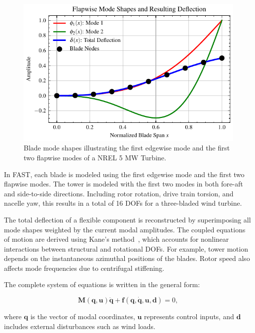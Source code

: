 \begin{figure}[ht]
    \centering
    \includegraphics[width=\textwidth]{Figures/blade_modes.pdf}
    \caption{Blade mode shapes illustrating the first edgewise mode and the first two flapwise modes of a NREL 5 MW Turbine.}
    \label{fig:blade_mode_shapes}
\end{figure}

In FAST, each blade is modeled using the first edgewise mode and the first two flapwise modes. The tower is modeled with the first two modes in both fore-aft and side-to-side directions. Including rotor rotation, drive train torsion, and nacelle yaw, this results in a total of 16 DOFs for a three-bladed wind turbine.

The total deflection of a flexible component is reconstructed by superimposing all mode shapes weighted by the current modal amplitudes. The coupled equations of motion are derived using Kane’s method~\cite{kane1985}, which accounts for nonlinear interactions between structural and rotational DOFs. For example, tower motion depends on the instantaneous azimuthal positions of the blades. Rotor speed also affects mode frequencies due to centrifugal stiffening.

The complete system of equations is written in the general form:

\begin{equation}
    \mathbf{M}(\mathbf{q}, \mathbf{u}) \ddot{\mathbf{q}} + \mathbf{f}(\mathbf{q}, \dot{\mathbf{q}}, \mathbf{u}, \mathbf{d}) = 0, \label{eq:general_eom}
\end{equation}

where $\mathbf{q}$ is the vector of modal coordinates, $\mathbf{u}$ represents control inputs, and $\mathbf{d}$ includes external disturbances such as wind loads.

